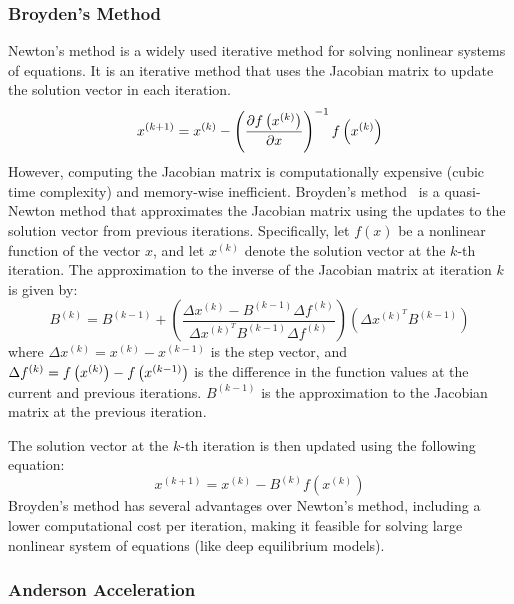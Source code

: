\subsubsection{Broyden's Method}
\label{subsubsec:broyden_method}

Newton's method is a widely used iterative method for solving nonlinear systems of equations. It is an iterative method that uses the Jacobian matrix to update the solution vector in each iteration.
%
\begin{equation}
  x^{(k+1)} = x^{(k)} - \left( \frac{\partial f\left(x^{(k)}\right)}{\partial x} \right)^{-1} f\left(x^{(k)}\right) \label{eq:newton_method}
\end{equation}
%
However, computing the Jacobian matrix is computationally expensive (cubic time complexity) and memory-wise inefficient. Broyden's method~\citep{broyden1965class} is a quasi-Newton method that approximates the Jacobian matrix using the updates to the solution vector from previous iterations. Specifically, let $f(x)$ be a nonlinear function of the vector $x$, and let $x^{(k)}$ denote the solution vector at the $k$-th iteration. The approximation to the inverse of the Jacobian matrix at iteration $k$ is given by:
%
\begin{equation}
  B^{(k)} = B^{(k-1)} + \left(\frac{\Delta x^{(k)} - B^{(k - 1)} \Delta f^{(k)}}{\Delta x^{(k)^T} B^{(k - 1)} \Delta f^{(k)}}\right) \left(\Delta x^{(k)^T} B^{(k - 1)}\right)
\end{equation}
%
where $\Delta x^{(k)} = x^{(k)} - x^{(k-1)}$ is the step vector, and $\Delta f^{(k)} = f\left(x^{(k)}\right) - f\left(x^{(k-1)}\right)$ is the difference in the function values at the current and previous iterations. $B^{(k-1)}$ is the approximation to the Jacobian matrix at the previous iteration.

The solution vector at the $k$-th iteration is then updated using the following equation:
%
\begin{equation}
  x^{(k+1)} = x^{(k)} - B^{(k)}f(x^{(k)})
\end{equation}
%
Broyden's method has several advantages over Newton's method, including a lower computational cost per iteration, making it feasible for solving large nonlinear system of equations (like deep equilibrium models).

\subsubsection{Anderson Acceleration}
\label{subsubsec:anderson_acceleration}


